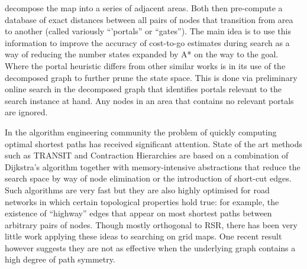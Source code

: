 decompose the map into a series of adjacent areas.  Both then pre-compute a
database of exact distances between all pairs of nodes that transition from area
to another (called variously ``'portals'' or ``gates'').  The main idea
is to use this information to improve the accuracy of cost-to-go estimates
during search as a way of reducing the number states expanded by A* on the way
to the goal. Where the portal heuristic differs from other similar works
\cite{bjornsson06,sturtevant09,felner09} is in its use of the decomposed
graph to further prune the state space. This is done via preliminary online 
search in the decomposed graph that identifies portals relevant to
the search instance at hand. Any nodes in an area that contains no relevant
portals are ignored.
\par
In the algorithm engineering community the problem of quickly computing optimal
shortest paths has received significant attention.  State of the art methods
such as TRANSIT \cite{bast06} and Contraction Hierarchies \cite{geisberger08}
are based on a combination of Dijkstra's algorithm together with
memory-intensive abstractions that reduce the search space by way of node
elimination or the introduction of short-cut edges.  Such algorithms are very
fast but they are also highly optimised for road networks in which certain
topological properties hold true: for example, the existence of ``highway''
edges that appear on most shortest paths between arbitrary pairs of nodes.
Though mostly orthogonal to RSR, there has been very little work applying these
ideas to searching on grid maps. One recent result however \cite{sturtevant10}
suggests they are not as effective when the underlying graph contains a high
degree of path symmetry.
